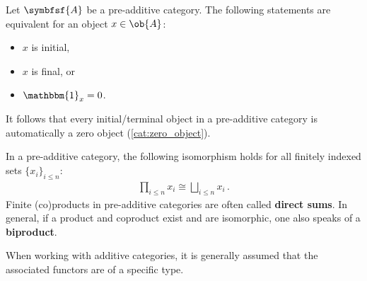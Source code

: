     \begin{property}
        Let $\symbfsf{A}$ be a pre-additive category. The following statements are equivalent for an object $x\in\ob{A}$:
        \begin{itemize}
            \item $x$ is initial,
            \item $x$ is final, or
            \item $\mathbbm{1}_x = 0$.
        \end{itemize}
        It follows that every initial/terminal object in a pre-additive category is automatically a zero object (\cref{cat:zero_object}).
    \end{property}
    \begin{property}[Biproducts]
        In a pre-additive category, the following isomorphism holds for all finitely indexed sets $\{x_i\}_{i\leq n}$:
        \begin{gather}
            \prod_{i\leq n}x_i\cong\bigsqcup_{i\leq n}x_i\,.
        \end{gather}
        Finite (co)products in pre-additive categories are often called \textbf{direct sums}. In general, if a product and coproduct exist and are isomorphic, one also speaks of a \textbf{biproduct}.
    \end{property}


    When working with additive categories, it is generally assumed that the associated functors are of a specific type.


